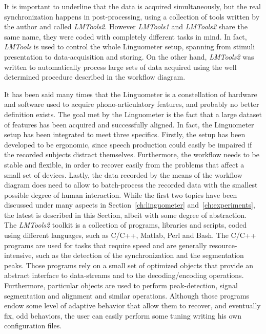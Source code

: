 It is important to underline that the data is acquired simultaneously, but the
real synchronization happens in post-processing, using a collection of tools
written by the author and called \emph{LMTools2}.
However \emph{LMTools1} and \emph{LMTools2} share the same name, they were coded
with completely different tasks in mind.
In fact, \emph{LMTools} is used to control the whole Linguometer setup, spanning
from stimuli presentation to data-acquisition and storing.
On the other hand, \emph{LMTools2} was written to automatically process large
sets of data acquired using the well determined procedure described in the
workflow diagram.

It has been said many times that the Linguometer is a constellation of hardware
and software used to acquire phono-articulatory features, and probably no better
definition exists.
The goal met by the Linguometer is the fact that a large dataset of features has
been acquired and successfully aligned.
In fact, the Linguometer setup has been integrated to meet three specifics.
Firstly, the setup has been developed to be ergonomic, since speech production
could easily be impaired if the recorded subjects distract themselves.
Furthermore, the workflow needs to be stable and flexible, in order to recover
easily from the problems that affect a small set of devices.
Lastly, the data recorded by the means of the workflow diagram does need to 
allow to batch-process the recorded data with the smallest possible degree of
human interaction.
While the first two topics have been discussed under many aspects in
Section~\ref{ch:linguometer} and~\ref{ch:experiments}, the latest is described
in this Section, albeit with some degree of abstraction.\\

The \emph{LMTools2} toolkit is a collection of programs, libraries and
scripts, coded using different languages, such as C/C++, Matlab, Perl and Bash.
The C/C++ programs are used for tasks that require speed and are generally
resource-intensive, such as the detection of the synchronization and the
segmentation peaks. 
Those programs rely on a small set of optimized objects that provide an
abstract interface to data-streams and to the decoding/encoding operations.
Furthermore, particular objects are used to perform peak-detection, signal
segmentation and alignment and similar operations.
Although those programs endow some level of adaptive behavior that allow them
to recover, and eventually fix, odd behaviors, the user can easily perform
some tuning writing his own configuration files.

